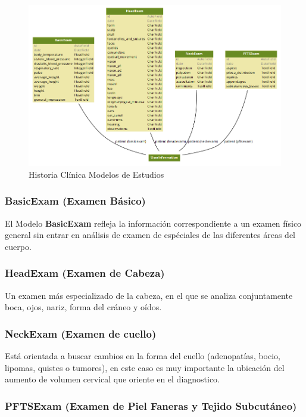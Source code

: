 \begin{figure}[H]
    \centering
    \includegraphics[scale=0.5]{resourse/hc3.png}
    \caption{Historia Clínica Modelos de Estudios}
    \label{fig:hc2}
\end{figure} 


\subsubsection{BasicExam (Examen Básico)}

El Modelo \textbf{BasicExam} refleja la información correspondiente a un examen físico general sin entrar en análisis de examen de espéciales de las diferentes áreas del cuerpo.


\subsubsection{HeadExam (Examen de Cabeza)}

Un examen más especializado de la cabeza,  en el que se analiza conjuntamente boca, ojos, nariz, forma del cráneo y oídos.


\subsubsection{NeckExam (Examen de cuello)}
Está orientada a buscar cambios en la forma del cuello (adenopatías, bocio, lipomas, quistes o tumores), en este caso es muy importante la ubicación del aumento de volumen cervical que oriente en el diagnostico.

\subsubsection{PFTSExam (Examen de Piel Faneras y Tejido Subcutáneo)}

